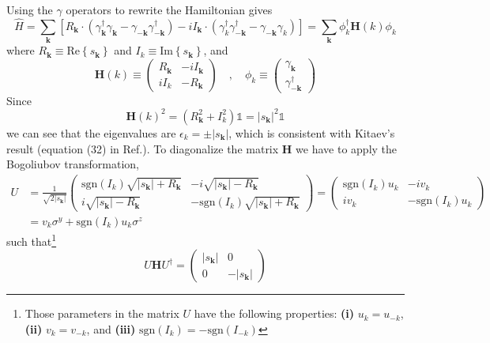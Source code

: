 \documentclass[12font]{article}
\theoremstyle{definition}
\newcommand{\lr}[1]{\left(  #1  \right)}
\newcommand{\lrm}[1]{\left[  #1  \right]}
\newcommand{\lrg}[1]{\left\{  #1  \right\}}
\newcommand{\abs}[1]{\left|  #1  \right|}
\newcommand{\mrm}[1]{\mathrm{#1}}
\newcommand{\bo}[1]{\mathbf{#1}}
\begin{document}
Using the $\gamma$ operators to rewrite the Hamiltonian gives
\[\hat{H} = \sum_{\bo{k}}\lrm{R_\bo{k}\cdot\lr{\gamma_{\bo{k}}^\dagger \gamma_{\bo{k}} - \gamma_{-\bo{k}}\gamma_{-\bo{k}}^\dagger} - iI_\bo{k}\cdot\lr{\gamma_{k}^\dagger \gamma_{-\bo{k}}^\dagger - \gamma_{-\bo{k}}\gamma_{k}}} = \sum_{\bo{k}}\phi_k^\dagger\bo{H}(k)\phi_k\]
where $R_{\bo{k}} \equiv \mrm{Re}\lrg{s_{\bo{k}}}$ and $I_k \equiv \mrm{Im}\lrg{s_{\bo{k}}}$, and 
\[\bo{H}(k) \equiv \begin{pmatrix}
                R_{\bo{k}} & -iI_{\bo{k}} \\
                iI_k & -R_{\bo{k}} 
              \end{pmatrix} \quad,\quad \phi_k \equiv \begin{pmatrix}
                                                        \gamma_{\bo{k}} \\
                                                        \gamma_{-\bo{k}}^\dagger 
                                                      \end{pmatrix}\]
Since 
\[\bo{H}(k)^2 = \lr{R_{\bo{k}}^2 + I_k^2}\mathds{1} = \abs{s_{\bo{k}}}^2\mathds{1}\]
we can see that the eigenvalues are $\epsilon_{k} = \pm\abs{s_{\bo{k}}}$, which is consistent with Kitaev's result (equation (32) in Ref.\cite{KitaevOriginal}). To diagonalize the matrix $\bo{H}$ we have to apply the Bogoliubov transformation,
\begin{align*}
U &= \frac{1}{\sqrt{2\abs{s_{\bo{k}}}}}
        \begin{pmatrix}
           \mrm{sgn}(I_k)\sqrt{\abs{s_{\bo{k}}}+R_{\bo{k}}} & -i\sqrt{\abs{s_{\bo{k}}}-R_{\bo{k}}} \\
           i\sqrt{\abs{s_{\bo{k}}}-R_{\bo{k}}} & -\mrm{sgn}(I_k)\sqrt{\abs{s_{\bo{k}}}+R_{\bo{k}}} 
         \end{pmatrix} 
         = 
         \begin{pmatrix}
           \mrm{sgn}(I_k) u_k & -iv_k \\
           i v_k &  -\mrm{sgn}(I_k) u_k
         \end{pmatrix} \\
         &= 
         v_k\sigma^y + \mrm{sgn}(I_k)u_k\sigma^z
\end{align*}
such that\footnote{Those parameters in the matrix $U$ have the following properties: \textbf{(i)} $u_k = u_{-k}$, \textbf{(ii)} $v_{k} = v_{-k}$, and  \textbf{(iii)} $\mrm{sgn}(I_{k}) = -\mrm{sgn}(I_{-k})$} 
\[U\bo{H}U^\dagger = \begin{pmatrix}
                       \abs{s_{\bo{k}}} & 0 \\
                       0 & -\abs{s_{\bo{k}}} 
                     \end{pmatrix}\]
\end{document}

